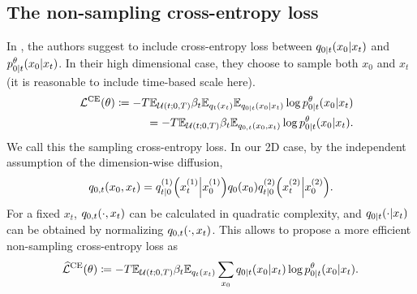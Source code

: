 \documentclass{article}
\begin{document}
\subsection{The non-sampling cross-entropy loss}
In \cite{campbell2022continuous,zhao2024unified}, the authors suggest to include cross-entropy loss between $q_{0|t}\qty(x_0|x_t)$ and $p^\theta_{0|t}\qty(x_0\middle|x_t)$. In their high dimensional case, they choose to sample both $x_0$ and $x_t$ (it is reasonable to include time-based scale here).
\begin{eqnarray}\label{eq:NormalCE}
  &&\mathcal{L}^\text{CE}(\theta) \coloneqq -T\mathbb{E}_{\mathcal{U}(t;0,T)}\beta_t\mathbb{E}_{q_t\qty(x_t)}\mathbb{E}_{q_{0|t}\qty(x_0|x_t)}\log p^\theta_{0|t}\qty(x_0\middle|x_t) \nonumber\\
  &&= -T\mathbb{E}_{\mathcal{U}(t;0,T)}\beta_t\mathbb{E}_{q_{0,t}\qty(x_0, x_t)}\log p^\theta_{0|t}\qty(x_0\middle|x_t).
\end{eqnarray}
We call this the sampling cross-entropy loss. In our 2D case, by the independent assumption of the dimension-wise diffusion,
\begin{eqnarray*}
  q_{0,t}\qty(x_0, x_t) = q^{(1)}_{t|0}\qty(x^{(1)}_t\middle|x^{(1)}_0) q_0\qty(x_0) q^{(2)}_{t|0}\qty(x^{(2)}_t\middle|x^{(2)}_0).
\end{eqnarray*}
For a fixed $x_t$, $q_{0,t}\qty(\cdot, x_t)$ can be calculated in quadratic complexity, and $q_{0|t}\qty(\cdot\middle|x_t)$ can be obtained by normalizing $q_{0,t}\qty(\cdot, x_t)$. This allows to propose a more efficient non-sampling cross-entropy loss as
\begin{eqnarray}\label{eq:SumCE}
  \widehat{\mathcal{L}}^\text{CE}(\theta)\coloneqq -T\mathbb{E}_{\mathcal{U}(t;0,T)}\beta_t\mathbb{E}_{q_t\qty(x_t)}\sum_{x_0}q_{0|t}\qty(x_0\middle|x_t)\log p^\theta_{0|t}\qty(x_0\middle|x_t).
\end{eqnarray}

\end{document}

